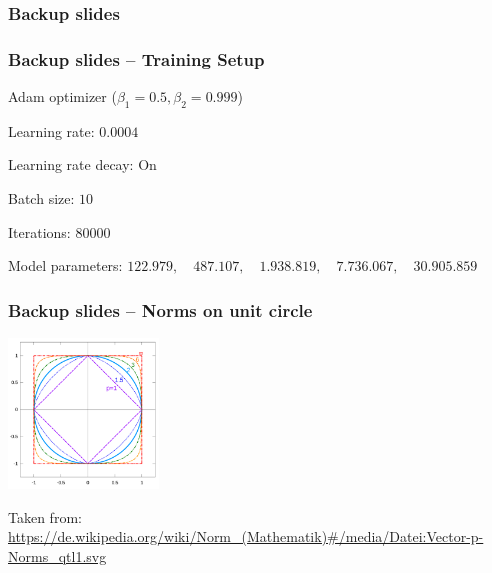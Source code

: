 \begin{frame}
    \frametitle{Backup slides}

\end{frame}
\clearpage

\begin{frame}
    \frametitle{Backup slides -- Training Setup}
    \vspace*{0.8cm}

Adam optimizer ($\beta_1 = 0.5, \beta_2 = 0.999$)

Learning rate: $0.0004$

Learning rate decay: On

Batch size: $10$

Iterations: $80000$

Model parameters: \newline $122.979, \quad 487.107, \quad 1.938.819, \quad 7.736.067, \quad  30.905.859$

\end{frame}
\clearpage

\begin{frame}
    \frametitle{Backup slides -- Norms on unit circle}
	\vspace*{1.25cm}
	\includegraphics[width=0.3\textwidth, height=0.5\textheight]{./Ressourcen/Praesentation/Bilder/norms.png}

	Taken from: \url{https://de.wikipedia.org/wiki/Norm_(Mathematik)\#/media/Datei:Vector-p-Norms_qtl1.svg}

\end{frame}
\clearpage